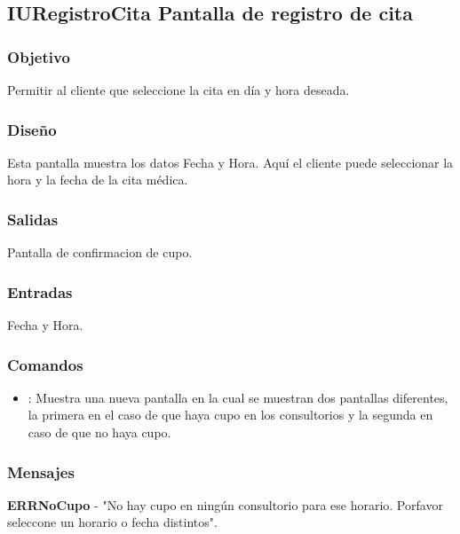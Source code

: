 \subsection{IURegistroCita Pantalla de registro de cita}

\subsubsection{Objetivo}
	Permitir al cliente que seleccione la cita en d\'ia y hora deseada.

\subsubsection{Diseño}
	Esta pantalla muestra los datos Fecha y  Hora. Aqu\'i  el cliente puede seleccionar la hora y la fecha de la cita m\'edica.


\subsubsection{Salidas}

	Pantalla de confirmacion de cupo.

\subsubsection{Entradas}

Fecha y Hora.

\subsubsection{Comandos}
\begin{itemize}
		\item {}: Muestra una nueva pantalla en la cual se muestran dos pantallas diferentes, la primera en el caso de que haya cupo en los consultorios y la segunda en caso de que no haya cupo.


\end{itemize}

\subsubsection{Mensajes}
	\begin{Citemize}
		\item {\bf ERRNoCupo} - "No hay cupo en ning\'un consultorio para ese horario. Porfavor seleccone un horario o fecha distintos".
	\end{Citemize}

